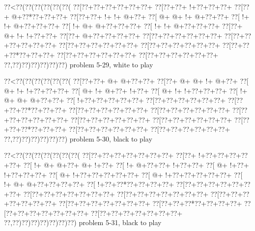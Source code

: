 \vbox{\vbox{\goo
\0??<\0??(\0??(\0??(\0??(\0??(\0??(
\0??[\0??+\0??+\0??+\0??+\0??+\0??+
\0??[\0??+\0??+\- !+\0??+\0??+\0??+
\0??[\0??+\- @+\0??*\0??+\0??+\0??+
\0??[\0??+\0??+\- !+\- !+\- @+\0??+
\0??[\- @+\- @+\- !+\- @+\0??+\0??+
\0??[\- !+\- !+\- @+\0??+\0??+\0??+
\0??[\- !+\- @+\- @+\0??+\0??+\0??+
\0??[\- !+\- !+\- @+\0??+\0??+\0??+
\0??[\0??+\- @+\- !+\- !+\0??+\0??+
\0??[\0??+\- @+\0??+\0??+\0??+\0??+
\0??[\0??+\0??+\0??+\0??+\0??+\0??+
\0??[\0??+\0??+\0??+\0??+\0??+\0??+
\0??[\0??+\0??+\0??+\0??+\0??+\0??+
\0??[\0??+\0??+\0??+\0??+\0??+\0??+
\0??[\0??+\0??+\0??*\0??+\0??+\0??+
\0??[\0??+\0??+\0??+\0??+\0??+\0??+
\0??[\0??+\0??+\0??+\0??+\0??+\0??+
\0??,\0??)\0??)\0??)\0??)\0??)\0??)
}
\hfil problem 5-29, white to play\hfil\break
}

\vbox{\vbox{\goo
\0??<\0??(\0??(\0??(\0??(\0??(\0??(
\0??[\0??+\0??+\- @+\- @+\0??+\0??+
\0??[\0??+\- @+\- @+\- !+\- @+\0??+
\0??[\- @+\- !+\- !+\0??+\0??+\0??+
\0??[\- @+\- !+\- @+\0??+\- !+\0??+
\0??[\- @+\- !+\- !+\0??+\0??+\0??+
\0??[\- !+\- @+\- @+\- @+\0??+\0??+
\0??[\- !+\0??+\0??+\0??+\0??+\0??+
\0??[\0??+\0??+\0??+\0??+\0??+\0??+
\0??[\0??+\0??+\0??*\0??+\0??+\0??+
\0??[\0??+\0??+\0??+\0??+\0??+\0??+
\0??[\0??+\0??+\0??+\0??+\0??+\0??+
\0??[\0??+\0??+\0??+\0??+\0??+\0??+
\0??[\0??+\0??+\0??+\0??+\0??+\0??+
\0??[\0??+\0??+\0??+\0??+\0??+\0??+
\0??[\0??+\0??+\0??*\0??+\0??+\0??+
\0??[\0??+\0??+\0??+\0??+\0??+\0??+
\0??[\0??+\0??+\0??+\0??+\0??+\0??+
\0??,\0??)\0??)\0??)\0??)\0??)\0??)
}
\hfil problem 5-30, black to play\hfil\break
}

\vbox{\vbox{\goo
\0??<\0??(\0??(\0??(\0??(\0??(\0??(\0??(
\0??[\0??+\0??+\0??+\0??+\0??+\0??+\0??+
\0??[\0??+\- !+\0??+\0??+\0??+\0??+\0??+
\0??[\- !+\- @+\- @+\0??+\- @+\- !+\0??+
\0??[\- !+\- @+\0??+\0??+\- !+\0??+\0??+
\0??[\- @+\- !+\0??+\- !+\0??+\0??+\0??+
\0??[\- @+\- !+\0??+\0??+\0??+\0??+\0??+
\0??[\- @+\- !+\0??+\0??+\0??+\0??+\0??+
\0??[\- !+\- @+\- @+\0??+\0??+\0??+\0??+
\0??[\- !+\0??+\0??*\0??+\0??+\0??+\0??+
\0??[\0??+\0??+\0??+\0??+\0??+\0??+\0??+
\0??[\0??+\0??+\0??+\0??+\0??+\0??+\0??+
\0??[\0??+\0??+\0??+\0??+\0??+\0??+\0??+
\0??[\0??+\0??+\0??+\0??+\0??+\0??+\0??+
\0??[\0??+\0??+\0??+\0??+\0??+\0??+\0??+
\0??[\0??+\0??+\0??*\0??+\0??+\0??+\0??+
\0??[\0??+\0??+\0??+\0??+\0??+\0??+\0??+
\0??[\0??+\0??+\0??+\0??+\0??+\0??+\0??+
\0??,\0??)\0??)\0??)\0??)\0??)\0??)\0??)
}
\hfil problem 5-31, black to play\hfil\break
}

